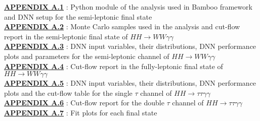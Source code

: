 \singlespacing
\textbf{\hyperref[App1]{APPENDIX A.1}} : Python module of the analysis used in Bamboo framework and DNN setup for the \wwgg semi-leptonic final state \\
\textbf{\hyperref[App2]{APPENDIX A.2}} : Monte Carlo samples used in the analysis and cut-flow report in the semi-leptonic final state of $HH\rightarrow{WW\gamma\gamma}$ \\
\textbf{\hyperref[App3]{APPENDIX A.3}} : DNN input variables, their distributions, DNN performance plots and parameters for the semi-leptonic channel of $HH\rightarrow{WW\gamma\gamma}$\\
\textbf{\hyperref[App4]{APPENDIX A.4}} : Cut-flow report in the fully-leptonic final state of $HH\rightarrow{WW\gamma\gamma}$ \\
\textbf{\hyperref[App5]{APPENDIX A.5}} : DNN input variables, their distributions, DNN performance plots and the cut-flow table for the single $\tau$ channel of $HH\rightarrow{\tau\tau\gamma\gamma}$ \\
\textbf{\hyperref[App6]{APPENDIX A.6}} : Cut-flow report for the double $\tau$ channel of $HH\rightarrow{\tau\tau\gamma\gamma}$ \\
\textbf{\hyperref[App7]{APPENDIX A.7}} : Fit plots for each final state \\
\newpage